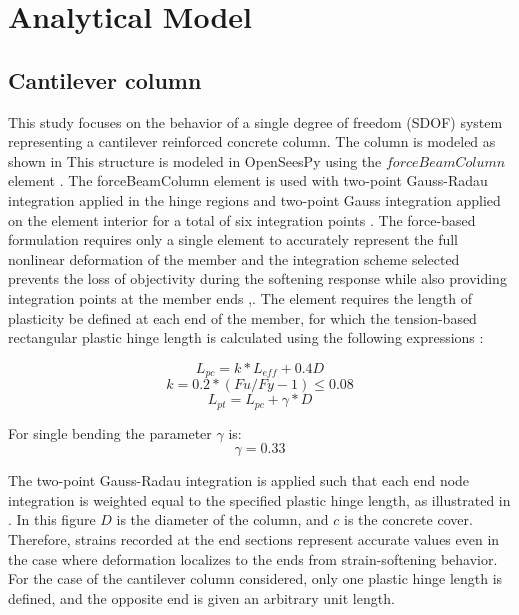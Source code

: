 \section{Analytical Model}

\subsection{Cantilever column}
This study focuses on the behavior of a single degree of freedom (SDOF) system representing a cantilever reinforced concrete column. The column is modeled as shown in  This structure is modeled in OpenSeesPy \cite{McKenna2010}\cite{Zhu2018} using the $forceBeamColumn$ element \cite{Scott}. The forceBeamColumn element is used with two-point Gauss-Radau integration applied in the hinge regions and two-point Gauss integration applied on the element interior for a total of six integration points \cite{Scott}. The force-based formulation requires only a single element to accurately represent the full nonlinear deformation of the member and the integration scheme selected prevents the loss of objectivity during the softening response while also providing integration points at the member ends \cite{Calabrese2010},\cite{Scott}. The element requires the length of plasticity be defined at each end of the member, for which the tension-based rectangular plastic hinge length is calculated using the following expressions \cite{Goodnight2013}:

\begin{equation}
    L_{pc}=k*L_{eff} + 0.4D
    \label{eq:LP_Comp}
\end{equation}
\begin{equation}
	k=0.2*(Fu/Fy - 1) \leqslant 0.08
	\label{eq:K_Lp}
\end{equation}
\begin{equation}
    L_{pt}=L_{pc}+\gamma*D
    \label{eq:LP_Tension}
\end{equation}

For single bending the parameter $\gamma$ is:
\begin{equation}
    \gamma=0.33
    \label{eq:Gamma_LPt}
\end{equation}

The two-point Gauss-Radau integration is applied such that each end node integration is weighted equal to the specified plastic hinge length, as illustrated in . In this figure $D$ is the diameter of the column, and $c$ is the concrete cover. Therefore, strains recorded at the end sections represent accurate values even in the case where deformation localizes to the ends from strain-softening behavior. For the case of the cantilever column considered, only one plastic hinge length is defined, and the opposite end is given an arbitrary unit length. 

